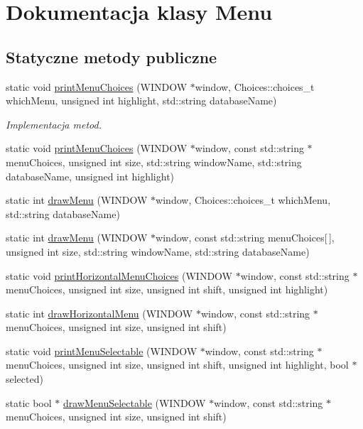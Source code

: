 \hypertarget{class_menu}{}\section{Dokumentacja klasy Menu}
\label{class_menu}
\subsection*{Statyczne metody publiczne}
\begin{DoxyCompactItemize}
\item 
static void \mbox{\hyperlink{class_menu_ad413f4b72438f65886bc5f5e370ad426}{print\+Menu\+Choices}} (W\+I\+N\+D\+OW $\ast$window, Choices\+::choices\+\_\+t which\+Menu, unsigned int highlight, std\+::string database\+Name)
\begin{DoxyCompactList}\small\item\em Implementacja metod. \end{DoxyCompactList}\item 
static void \mbox{\hyperlink{class_menu_a5faa9cd8e2be7ef81916032c64a1d460}{print\+Menu\+Choices}} (W\+I\+N\+D\+OW $\ast$window, const std\+::string $\ast$menu\+Choices, unsigned int size, std\+::string window\+Name, std\+::string database\+Name, unsigned int highlight)
\item 
static int \mbox{\hyperlink{class_menu_a452bfc7ce14d367bdf38cee636f09b0c}{draw\+Menu}} (W\+I\+N\+D\+OW $\ast$window, Choices\+::choices\+\_\+t which\+Menu, std\+::string database\+Name)
\item 
static int \mbox{\hyperlink{class_menu_a8c2a73e33c0cbf1a8b09b2c4831ea2b8}{draw\+Menu}} (W\+I\+N\+D\+OW $\ast$window, const std\+::string menu\+Choices\mbox{[}$\,$\mbox{]}, unsigned int size, std\+::string window\+Name, std\+::string database\+Name)
\item 
static void \mbox{\hyperlink{class_menu_aea098dfc2a133fae9e4b1c3c31bdc448}{print\+Horizontal\+Menu\+Choices}} (W\+I\+N\+D\+OW $\ast$window, const std\+::string $\ast$menu\+Choices, unsigned int size, unsigned int shift, unsigned int highlight)
\item 
static int \mbox{\hyperlink{class_menu_a22e5c26ac2b73a702749a0229ad4fcba}{draw\+Horizontal\+Menu}} (W\+I\+N\+D\+OW $\ast$window, const std\+::string $\ast$menu\+Choices, unsigned int size, unsigned int shift)
\item 
static void \mbox{\hyperlink{class_menu_afcf3606c830a65335e61b1d0bd4e432a}{print\+Menu\+Selectable}} (W\+I\+N\+D\+OW $\ast$window, const std\+::string $\ast$menu\+Choices, unsigned int size, unsigned int shift, unsigned int highlight, bool $\ast$selected)
\item 
static bool $\ast$ \mbox{\hyperlink{class_menu_adf2ca061cdf65bd87500c74c1f1c2584}{draw\+Menu\+Selectable}} (W\+I\+N\+D\+OW $\ast$window, const std\+::string $\ast$menu\+Choices, unsigned int size, unsigned int shift)
\end{DoxyCompactItemize}
